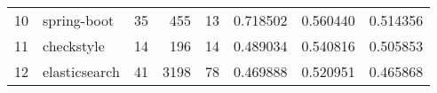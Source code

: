 \begin{tabular}{llrrrrrr}
10 &        spring-boot &                         35 &                        455 &                                 13 &                    0.718502 &                 0.560440 &             0.514356 \\
11 &         checkstyle &                         14 &                        196 &                                 14 &                    0.489034 &                 0.540816 &             0.505853 \\
12 &      elasticsearch &                         41 &                       3198 &                                 78 &                    0.469888 &                 0.520951 &             0.465868 \\
\bottomrule
\end{tabular}
